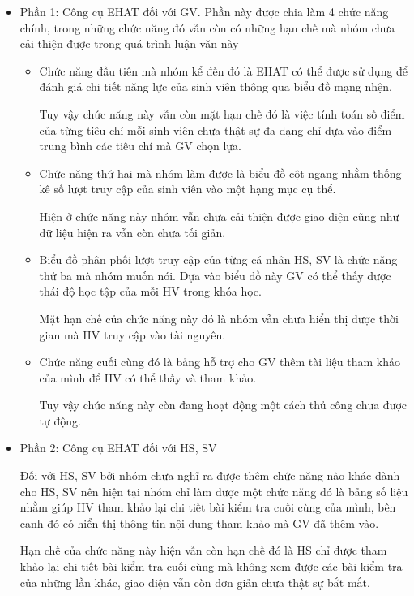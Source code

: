 \begin{itemize}
	\item Phần 1: Công cụ EHAT đối với GV.
	Phần này được chia làm 4 chức năng chính, trong những chức năng đó vẫn còn có những hạn chế mà nhóm chưa cải thiện được trong quá trình luận văn này
	\begin{itemize}
		\item Chức năng đầu tiên mà nhóm kể đến đó là EHAT có thể được sử dụng để đánh giá chi tiết năng lực của sinh viên thông qua biểu đồ mạng nhện. 
		
		Tuy vậy chức năng này vẫn còn mặt hạn chế đó là việc tính toán số điểm của từng tiêu chí mỗi sinh viên chưa thật sự đa dạng chỉ dựa vào điểm trung bình các tiêu chí mà GV chọn lựa.
		
		\item Chức năng thứ hai mà nhóm làm được là biểu đồ cột ngang nhằm thống kê số lượt truy cập của sinh viên vào một hạng mục cụ thể. 
		
		Hiện ở chức năng này nhóm vẫn chưa cải thiện được giao diện cũng như dữ liệu hiện ra vẫn còn chưa tối giản.
		
		\item Biểu đồ phân phối lượt truy cập của từng cá nhân HS, SV là chức năng thứ ba mà nhóm muốn nói. Dựa vào biểu đồ này GV có thể thấy được thái độ học tập của mỗi HV trong khóa học. 
		
		Mặt hạn chế của chức năng này đó là nhóm vẫn chưa hiển thị được thời gian mà HV truy cập vào tài nguyên.
		
		\item Chức năng cuối cùng đó là bảng hỗ trợ cho GV thêm tài liệu tham khảo của mình để HV có thể thấy và tham khảo. 
		
		Tuy vậy chức năng này còn đang hoạt động một cách thủ công chưa được tự động.
	\end{itemize}
	\item Phần 2: Công cụ EHAT đối với HS, SV
	
	Đối với HS, SV bởi nhóm chưa nghĩ ra được thêm chức năng nào khác dành cho HS, SV nên hiện tại nhóm chỉ làm được một chức năng đó là bảng số liệu nhằm giúp HV tham khảo lại chi tiết bài kiểm tra cuối cùng của mình, bên cạnh đó có hiển thị thông tin nội dung tham khảo mà GV đã thêm vào.
	
	Hạn chế của chức năng này hiện vẫn còn hạn chế đó là HS chỉ được tham khảo lại chi tiết bài kiểm tra cuối cùng mà không xem được các bài kiểm tra của những lần khác, giao diện vẫn còn đơn giản chưa thật sự bắt mắt.
\end{itemize}

